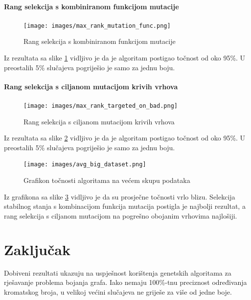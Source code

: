 \documentclass[times, utf8, zavrsni, numeric]{fer}
\begin{document}
\subsubsection{Rang selekcija s kombiniranom funkcijom mutacije}

\begin{figure}[h]
\centering
\texttt{[image: images/max\_rank\_mutation\_func.png]}
\caption{Rang selekcija s kombiniranom funkcijom mutacije}
\label{fig:rank selekcija kombinirana rezultati}
\end{figure}

Iz rezultata sa slike \ref{fig:rank selekcija kombinirana rezultati} vidljivo je da je algoritam postigao točnost od oko 95\%. U preostalih 5\% slučajeva pogriješio je samo za jednu boju.

\newpage
\subsubsection{Rang selekcija s ciljanom mutacijom krivih vrhova}

\begin{figure}[h]
\centering
\texttt{[image: images/max\_rank\_targeted\_on\_bad.png]}
\caption{Rang selekcija s ciljanom mutacijom krivih vrhova}
\label{fig:rank selekcija ciljana random rezultati}
\end{figure}

Iz rezultata sa slike \ref{fig:rank selekcija ciljana random rezultati} vidljivo je da je algoritam postigao točnost od oko 95\%. U preostalih 5\% slučajeva pogriješio je samo za jednu boju.

\begin{figure}[h]
\centering
\texttt{[image: images/avg\_big\_dataset.png]}
\caption{Grafikon točnosti algoritama na većem skupu podataka}
\label{fig:grafikon tocnosti algoritama na vecem skupu podataka}
\end{figure}

Iz grafikona sa slike \ref{fig:grafikon tocnosti algoritama na vecem skupu podataka} vidljivo je da su prosječne točnosti vrlo blizu. Selekcija stabilnog stanja s kombinacijom funkcija mutacija postigla je najbolji rezultat, a rang selekcija s ciljanom mutacijom na pogrešno obojanim vrhovima najlošiji.

\chapter{Zaključak}
Dobiveni rezultati ukazuju na uspješnost korištenja genetskih algoritama za rješavanje problema bojanja grafa. Iako nemaju 100\%-tnu preciznost određivanja kromatskog broja, u velikoj većini slučajeva ne griješe za više od jedne boje. 
\end{document}
